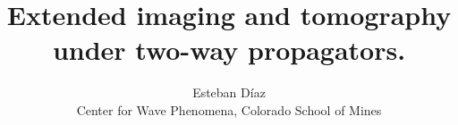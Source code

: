 

\newcommand*{\mytext}[2]{%
\noindent\color{#1!80}{%
\parbox{0.98\linewidth}{#2}}}%


\author{\textup{Esteban D\'{i}az}\\
Center for Wave Phenomena,  
Colorado School of Mines}

\title{Extended imaging and tomography under two-way propagators.}

\maketitle


\newif\ifreport
\reporttrue
















